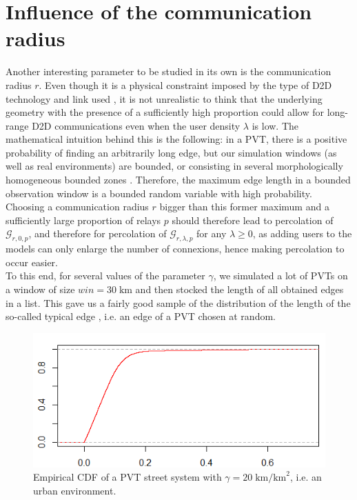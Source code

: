 \documentclass[conference]{IEEEtran}
\begin{document}
\section{Influence of the communication radius}
\label{radius-influence}
Another interesting parameter to be studied in its own is the communication radius $r$. Even though it is a physical constraint imposed by the type of D2D technology and link used \cite{asadi_survey_2014}, it is not unrealistic to think that the underlying geometry with the presence of a sufficiently high proportion could allow for long-range D2D communications even when the user density $\lambda$ is low. The mathematical intuition behind this is the following: in a PVT, there is a positive probability of finding an arbitrarily long edge, but our simulation windows (as well as real environments) are bounded, or consisting in several morphologically homogeneous bounded zones \cite{courtat_promenade_2012}. Therefore, the maximum edge length in a bounded observation window is a bounded random variable with high probability. Choosing a communication radius $r$ bigger than this former maximum and a sufficiently large proportion of relays $p$ should therefore lead to percolation of $\mathcal{G}_{r,0,p}$, and therefore for percolation of $\mathcal{G}_{r,\lambda,p}$ for any $\lambda \geq 0$, as adding users to the models can only enlarge the number of connexions, hence making percolation to occur easier. \\
\indent To this end, for several values of the parameter $\gamma$, we simulated a lot of PVTs on a window of size $win = 30 \; \text{km}$ and then stocked the length of all obtained edges in a list. This gave us a fairly good sample of the distribution of the length of the so-called typical edge \cite{muche2005poisson}, i.e. an edge of a PVT chosen at random. %
\begin{figure}[t!]
\centering
\includegraphics[width=\columnwidth]{Figures/PVT-street-length-20.png}
\caption{Empirical CDF of a PVT street system with $\gamma = 20 \; \text{km/km}^{2}$, i.e. an urban environment.}
\label{PVT-length-20}
\end{figure} 
\end{document}
